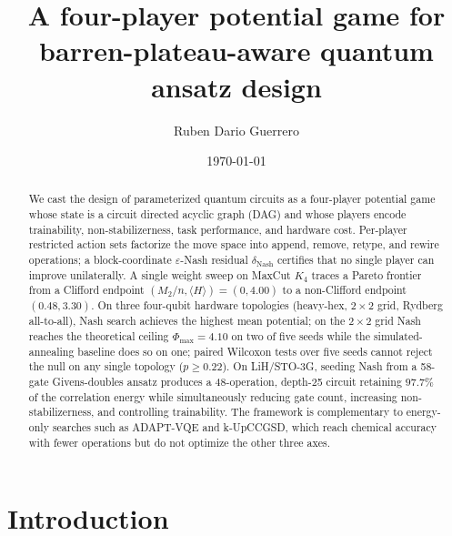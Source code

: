 \documentclass[a4paper,onecolumn,noarxiv]{quantumarticle}
\begin{document}
\title{A four-player potential game for barren-plateau-aware quantum ansatz design}

\author{Ruben Dario Guerrero}

\date{\today}

\begin{abstract}
We cast the design of parameterized quantum circuits as a four-player potential game whose state is a circuit directed acyclic graph (DAG) and whose players encode trainability, non-stabilizerness, task performance, and hardware cost. Per-player restricted action sets factorize the move space into append, remove, retype, and rewire operations; a block-coordinate $\varepsilon$-Nash residual $\delta_\text{Nash}$ certifies that no single player can improve unilaterally. A single weight sweep on MaxCut $K_4$ traces a Pareto frontier from a Clifford endpoint $(M_2/n,\langle H\rangle)=(0,4.00)$ to a non-Clifford endpoint $(0.48,3.30)$. On three four-qubit hardware topologies (heavy-hex, $2\times 2$ grid, Rydberg all-to-all), Nash search achieves the highest mean potential; on the $2\times 2$ grid Nash reaches the theoretical ceiling $\Phi_\text{max}=4.10$ on two of five seeds while the simulated-annealing baseline does so on one; paired Wilcoxon tests over five seeds cannot reject the null on any single topology ($p\ge 0.22$). On LiH/STO-3G, seeding Nash from a 58-gate Givens-doubles ansatz produces a 48-operation, depth-25 circuit retaining $97.7\%$ of the correlation energy while simultaneously reducing gate count, increasing non-stabilizerness, and controlling trainability. The framework is complementary to energy-only searches such as ADAPT-VQE and k-UpCCGSD, which reach chemical accuracy with fewer operations but do not optimize the other three axes.
\end{abstract}

\maketitle

\section{Introduction}
\label{sec:intro}
\end{document}
